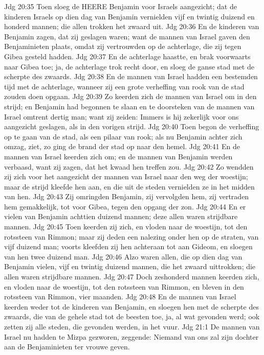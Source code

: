 Jdg 20:35  Toen sloeg de HEERE Benjamin voor Israels aangezicht; dat de kinderen Israels op dien dag van Benjamin vernielden vijf en twintig duizend en honderd mannen; die allen trokken het zwaard uit.
Jdg 20:36  En de kinderen van Benjamin zagen, dat zij geslagen waren; want de mannen van Israel gaven den Benjaminieten plaats, omdat zij vertrouwden op de achterlage, die zij tegen Gibea gesteld hadden.
Jdg 20:37  En de achterlage haastte, en brak voorwaarts naar Gibea toe; ja, de achterlage trok recht door, en sloeg de ganse stad met de scherpte des zwaards.
Jdg 20:38  En de mannen van Israel hadden een bestemden tijd met de achterlage, wanneer zij een grote verheffing van rook van de stad zouden doen opgaan.
Jdg 20:39  Zo keerden zich de mannen van Israel om in den strijd; en Benjamin had begonnen te slaan en te doorsteken van de mannen van Israel omtrent dertig man; want zij zeiden: Immers is hij zekerlijk voor ons aangezicht geslagen, als in den vorigen strijd.
Jdg 20:40  Toen begon de verheffing op te gaan van de stad, als een pilaar van rook; als nu Benjamin achter zich omzag, ziet, zo ging de brand der stad op naar den hemel.
Jdg 20:41  En de mannen van Israel keerden zich om; en de mannen van Benjamin werden verbaasd, want zij zagen, dat het kwaad hen treffen zou.
Jdg 20:42  Zo wendden zij zich voor het aangezicht der mannen van Israel naar den weg der woestijn; maar de strijd kleefde hen aan, en die uit de steden vernielden ze in het midden van hen.
Jdg 20:43  Zij omringden Benjamin, zij vervolgden hem, zij vertraden hem gemakkelijk, tot voor Gibea, tegen den opgang der zon.
Jdg 20:44  En er vielen van Benjamin achttien duizend mannen; deze allen waren strijdbare mannen.
Jdg 20:45  Toen keerden zij zich, en vloden naar de woestijn, tot den rotssteen van Rimmon; maar zij deden een nalezing onder hen op de straten, van vijf duizend man; voorts kleefden zij hen achteraan tot aan Gideom, en sloegen van hen twee duizend man.
Jdg 20:46  Alzo waren allen, die op dien dag van Benjamin vielen, vijf en twintig duizend mannen, die het zwaard uittrokken; die allen waren strijdbare mannen.
Jdg 20:47  Doch zeshonderd mannen keerden zich, en vloden naar de woestijn, tot den rotssteen van Rimmon, en bleven in den rotssteen van Rimmon, vier maanden.
Jdg 20:48  En de mannen van Israel keerden weder tot de kinderen van Benjamin, en sloegen hen met de scherpte des zwaards, die van de gehele stad tot de beesten toe, ja, al wat gevonden werd; ook zetten zij alle steden, die gevonden werden, in het vuur.
Jdg 21:1  De mannen van Israel nu hadden te Mizpa gezworen, zeggende: Niemand van ons zal zijn dochter aan de Benjaminieten ter vrouwe geven.
